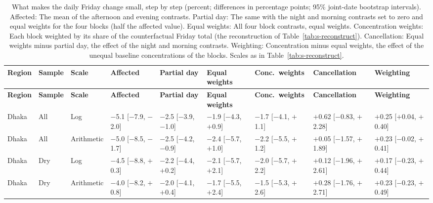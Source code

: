 \begingroup\scriptsize
\begin{longtable}{L{1.2cm} L{1.1cm} L{1.4cm} C{1.75cm} C{1.75cm} C{1.75cm} C{1.75cm} C{1.75cm} C{1.75cm}}
\caption{What makes the daily Friday change small, step by step (percent; differences in percentage points; 95\% joint-date bootstrap intervals). Affected: The mean of the afternoon and evening contrasts. Partial day: The same with the night and morning contrasts set to zero and equal weights for the four blocks (half the affected value). Equal weights: All four block contrasts, equal weights. Concentration weights: Each block weighted by its share of the counterfactual Friday total (the reconstruction of Table~\ref{tab:s-reconstruct}). Cancellation: Equal weights minus partial day, the effect of the night and morning contrasts. Weighting: Concentration minus equal weights, the effect of the unequal baseline concentrations of the blocks. Scales as in Table~\ref{tab:s-reconstruct}.}\label{tab:s-decompose}\\
\toprule
\textbf{Region} & \textbf{Sample} & \textbf{Scale} & \textbf{Affected} & \textbf{Partial day} & \textbf{Equal weights} & \textbf{Conc.\ weights} & \textbf{Cancel\-lation} & \textbf{Weighting} \\
\midrule\endfirsthead
\toprule
\textbf{Region} & \textbf{Sample} & \textbf{Scale} & \textbf{Affected} & \textbf{Partial day} & \textbf{Equal weights} & \textbf{Conc.\ weights} & \textbf{Cancel\-lation} & \textbf{Weighting} \\
\midrule\endhead
\bottomrule\endfoot
Dhaka & All & Log & $-$5.1 {\scriptsize[$-$7.9, $-$2.0]} & $-$2.5 {\scriptsize[$-$3.9, $-$1.0]} & $-$1.9 {\scriptsize[$-$4.3, $+$0.9]} & $-$1.7 {\scriptsize[$-$4.1, $+$1.1]} & $+$0.62 {\scriptsize[$-$0.83, $+$2.28]} & $+$0.25 {\scriptsize[$+$0.04, $+$0.40]} \\
Dhaka & All & Arithmetic & $-$5.0 {\scriptsize[$-$8.5, $-$1.7]} & $-$2.5 {\scriptsize[$-$4.2, $-$0.9]} & $-$2.4 {\scriptsize[$-$5.7, $+$1.0]} & $-$2.2 {\scriptsize[$-$5.5, $+$1.2]} & $+$0.05 {\scriptsize[$-$1.57, $+$1.89]} & $+$0.23 {\scriptsize[$-$0.02, $+$0.41]} \\
Dhaka & Dry & Log & $-$4.5 {\scriptsize[$-$8.8, $+$0.3]} & $-$2.2 {\scriptsize[$-$4.4, $+$0.2]} & $-$2.1 {\scriptsize[$-$5.7, $+$2.1]} & $-$2.0 {\scriptsize[$-$5.7, $+$2.2]} & $+$0.12 {\scriptsize[$-$1.96, $+$2.61]} & $+$0.17 {\scriptsize[$-$0.23, $+$0.44]} \\
Dhaka & Dry & Arithmetic & $-$4.0 {\scriptsize[$-$8.2, $+$0.8]} & $-$2.0 {\scriptsize[$-$4.1, $+$0.4]} & $-$1.7 {\scriptsize[$-$5.5, $+$2.4]} & $-$1.5 {\scriptsize[$-$5.3, $+$2.6]} & $+$0.28 {\scriptsize[$-$1.76, $+$2.71]} & $+$0.23 {\scriptsize[$-$0.23, $+$0.49]} \\

\end{longtable}
